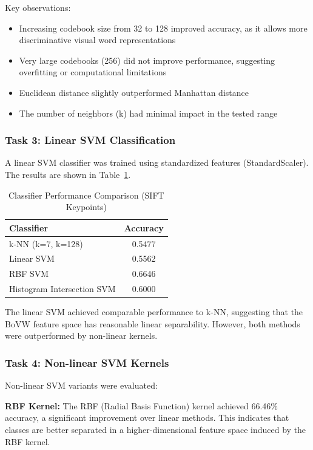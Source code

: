 \documentclass[conference]{IEEEtran}
\begin{document}
Key observations:
\begin{itemize}
\item Increasing codebook size from 32 to 128 improved accuracy, as it allows more discriminative visual word representations
\item Very large codebooks (256) did not improve performance, suggesting overfitting or computational limitations
\item Euclidean distance slightly outperformed Manhattan distance
\item The number of neighbors (k) had minimal impact in the tested range
\end{itemize}

\subsubsection{Task 3: Linear SVM Classification}

A linear SVM classifier was trained using standardized features (StandardScaler). The results are shown in Table~\ref{tab:lab1_classifiers}.

\begin{table}[H]
\centering
\caption{Classifier Performance Comparison (SIFT Keypoints)}
\label{tab:lab1_classifiers}
\begin{tabular}{@{}lc@{}}
\toprule
\textbf{Classifier} & \textbf{Accuracy} \\ \midrule
k-NN (k=7, k=128) & 0.5477 \\
Linear SVM & 0.5562 \\
RBF SVM & 0.6646 \\
Histogram Intersection SVM & 0.6000 \\ \bottomrule
\end{tabular}
\end{table}

The linear SVM achieved comparable performance to k-NN, suggesting that the BoVW feature space has reasonable linear separability. However, both methods were outperformed by non-linear kernels.

\subsubsection{Task 4: Non-linear SVM Kernels}

Non-linear SVM variants were evaluated:

\textbf{RBF Kernel:} The RBF (Radial Basis Function) kernel achieved 66.46\% accuracy, a significant improvement over linear methods. This indicates that classes are better separated in a higher-dimensional feature space induced by the RBF kernel.
\end{document}
